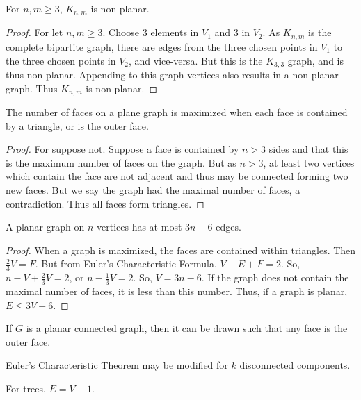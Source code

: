 \documentclass[crop=false,class=book,oneside]{standalone}
\begin{document}
        \begin{theorem}
        For $n,m\geq 3$, $K_{n,m}$ is non-planar.
        \end{theorem}
        \begin{proof}
        For let $n,m\geq 3$. Choose $3$ elements in $V_1$ and $3$ in $V_2$. As $K_{n,m}$ is the complete bipartite graph, there are edges from the three chosen points in $V_1$ to the three chosen points in $V_2$, and vice-versa. But this is the $K_{3,3}$ graph, and is thus non-planar. Appending to this graph vertices also results in a non-planar graph. Thus $K_{n,m}$ is non-planar.
        \end{proof}
        \begin{lemma}
        The number of faces on a plane graph is maximized when each face is contained by a triangle, or is the outer face.
        \end{lemma}
        \begin{proof}
        For suppose not. Suppose a face is contained by $n>3$ sides and that this is the maximum number of faces on the graph. But as $n>3$, at least two vertices which contain the face are not adjacent and thus may be connected forming two new faces. But we say the graph had the maximal number of faces, a contradiction. Thus all faces form triangles.
        \end{proof}
        \begin{theorem}
        A planar graph on $n$ vertices has at most $3n-6$ edges.
        \end{theorem}
        \begin{proof}
        When a graph is maximized, the faces are contained within triangles. Then $\frac{2}{3}V= F$. But from Euler's Characteristic Formula, $V-E+F=2$. So, $n-V+\frac{2}{3}V = 2$, or $n-\frac{1}{3}V = 2$. So, $V=3n-6$. If the graph does not contain the maximal number of faces, it is less than this number. Thus, if a graph is planar, $E\leq 3V-6$.
        \end{proof}
        \begin{theorem}
        If $G$ is a planar connected graph, then it can be drawn such that any face is the outer face.
        \end{theorem}
        \begin{theorem}
        Euler's Characteristic Theorem may be modified for $k$ disconnected components.
        \end{theorem}
        \begin{corollary}
        For trees, $E=V-1$.
        \end{corollary}
\end{document}
